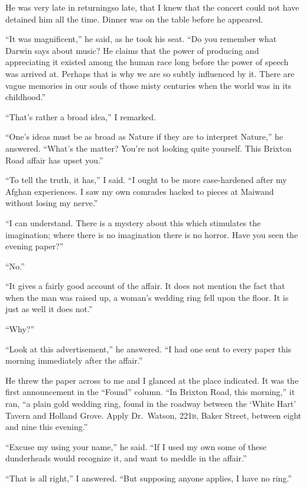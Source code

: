 \documentclass[12pt,english]{book}
\newcommand{\noun}[1]{\textsc{#1}}
\begin{document}
He was very late in returning\mdsh{---}so late, that I knew that
the concert could not have detained him all the time. Dinner was on
the table before he appeared.

{}``It was magnificent,'' he said, as he took his seat. {}``Do
you remember what Darwin says about music? He claims that the power
of producing and appreciating it existed among the human race long
before the power of speech was arrived at. Perhaps that is why we
are so subtly influenced by it. There are vague memories in our souls
of those misty centuries when the world was in its childhood.''

{}``That's rather a broad idea,'' I remarked.

{}``One's ideas must be as broad as Nature if they are to interpret
Nature,'' he answered. {}``What's the matter? You're not looking
quite yourself. This Brixton Road affair has upset you.''

{}``To tell the truth, it has,'' I said. {}``I ought to be more
case-hardened after my Afghan experiences. I saw my own comrades hacked
to pieces at Maiwand without losing my nerve.''

{}``I can understand. There is a mystery about this which stimulates
the imagination; where there is no imagination there is no horror.
Have you seen the evening paper?''

{}``No.''

{}``It gives a fairly good account of the affair. It does not mention
the fact that when the man was raised up, a woman's wedding ring fell
upon the floor. It is just as well it does not.''

{}``Why?''

{}``Look at this advertisement,'' he answered. {}``I had one sent
to every paper this morning immediately after the affair.''

He threw the paper across to me and I glanced at the place indicated.
It was the first announcement in the {}``Found'' column. {}``In
Brixton Road, this morning,'' it ran, {}``a plain gold wedding ring,
found in the roadway between the `White Hart' Tavern and Holland Grove.
Apply Dr.\ Watson, \noun{221b}, Baker Street, between eight and
nine this evening.''

{}``Excuse my using your name,'' he said. {}``If I used my own
some of these dunderheads would recognize it, and want to meddle in
the affair.''

{}``That is all right,'' I answered. {}``But supposing anyone applies,
I have no ring.''
\end{document}

